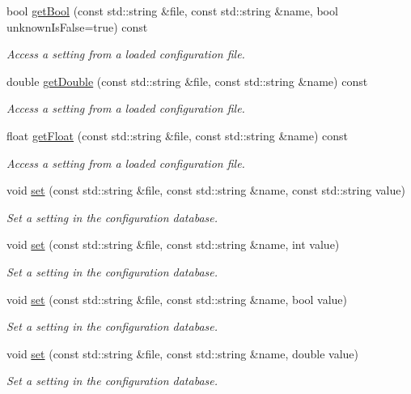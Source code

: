 \begin{DoxyCompactItemize}
bool \hyperlink{class_config_a28fdb5bcf67d57b5df952e9f667f313f}{get\+Bool} (const std\+::string \&file, const std\+::string \&name, bool unknown\+Is\+False=true) const 
\begin{DoxyCompactList}\small\item\em Access a setting from a loaded configuration file. \end{DoxyCompactList}\item 
double \hyperlink{class_config_aaa35e0251f6920bf5cb42c8c1edad6f7}{get\+Double} (const std\+::string \&file, const std\+::string \&name) const 
\begin{DoxyCompactList}\small\item\em Access a setting from a loaded configuration file. \end{DoxyCompactList}\item 
float \hyperlink{class_config_acd8be5c460303ba4a5df8036f99e5935}{get\+Float} (const std\+::string \&file, const std\+::string \&name) const 
\begin{DoxyCompactList}\small\item\em Access a setting from a loaded configuration file. \end{DoxyCompactList}\item 
void \hyperlink{class_config_a95d6afbbffc9cfa02a9d1171d48c9e8b}{set} (const std\+::string \&file, const std\+::string \&name, const std\+::string value)
\begin{DoxyCompactList}\small\item\em Set a setting in the configuration database. \end{DoxyCompactList}\item 
void \hyperlink{class_config_a3cd33d32e89a8831a7047653c217d760}{set} (const std\+::string \&file, const std\+::string \&name, int value)
\begin{DoxyCompactList}\small\item\em Set a setting in the configuration database. \end{DoxyCompactList}\item 
void \hyperlink{class_config_ac2b0c38ab146ff4e2de8dbe10fc08b36}{set} (const std\+::string \&file, const std\+::string \&name, bool value)
\begin{DoxyCompactList}\small\item\em Set a setting in the configuration database. \end{DoxyCompactList}\item 
void \hyperlink{class_config_adc58efca4fe18f3338b82b3cbe7d6f94}{set} (const std\+::string \&file, const std\+::string \&name, double value)
\begin{DoxyCompactList}\small\item\em Set a setting in the configuration database. \end{DoxyCompactList}\end{DoxyCompactItemize}
